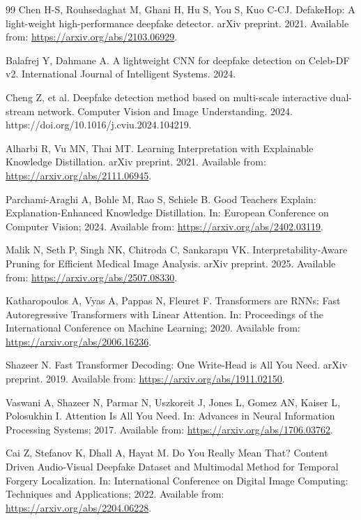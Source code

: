 \documentclass[pdflatex,sn-basic,Numbered]{sn-jnl}
\begin{document}
\begin{thebibliography}{99}
Chen H-S, Rouhsedaghat M, Ghani H, Hu S, You S, Kuo C-CJ. DefakeHop: A light-weight high-performance deepfake detector. arXiv preprint. 2021. Available from: \url{https://arxiv.org/abs/2103.06929}.

Balafrej Y, Dahmane A. A lightweight CNN for deepfake detection on Celeb-DF v2. International Journal of Intelligent Systems. 2024.

Cheng Z, et al. Deepfake detection method based on multi-scale interactive dual-stream network. Computer Vision and Image Understanding. 2024. https://doi.org/10.1016/j.cviu.2024.104219.

Alharbi R, Vu MN, Thai MT. Learning Interpretation with Explainable Knowledge Distillation. arXiv preprint. 2021. Available from: \url{https://arxiv.org/abs/2111.06945}.

Parchami-Araghi A, Bohle M, Rao S, Schiele B. Good Teachers Explain: Explanation-Enhanced Knowledge Distillation. In: European Conference on Computer Vision; 2024. Available from: \url{https://arxiv.org/abs/2402.03119}.

Malik N, Seth P, Singh NK, Chitroda C, Sankarapu VK. Interpretability-Aware Pruning for Efficient Medical Image Analysis. arXiv preprint. 2025. Available from: \url{https://arxiv.org/abs/2507.08330}.

Katharopoulos A, Vyas A, Pappas N, Fleuret F. Transformers are RNNs: Fast Autoregressive Transformers with Linear Attention. In: Proceedings of the International Conference on Machine Learning; 2020. Available from: \url{https://arxiv.org/abs/2006.16236}.

Shazeer N. Fast Transformer Decoding: One Write-Head is All You Need. arXiv preprint. 2019. Available from: \url{https://arxiv.org/abs/1911.02150}.

Vaswani A, Shazeer N, Parmar N, Uszkoreit J, Jones L, Gomez AN, Kaiser L, Polosukhin I. Attention Is All You Need. In: Advances in Neural Information Processing Systems; 2017. Available from: \url{https://arxiv.org/abs/1706.03762}.

Cai Z, Stefanov K, Dhall A, Hayat M. Do You Really Mean That? Content Driven Audio-Visual Deepfake Dataset and Multimodal Method for Temporal Forgery Localization. In: International Conference on Digital Image Computing: Techniques and Applications; 2022. Available from: \url{https://arxiv.org/abs/2204.06228}.


\end{thebibliography}
\end{document}
